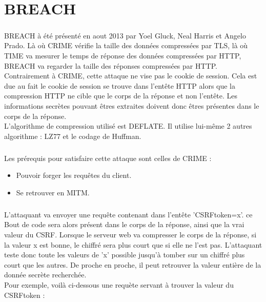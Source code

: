 \chapter{BREACH}
\label{chap:breach}

\paragraph{}
BREACH à été présenté en aout 2013 par Yoel Gluck, Neal Harris et Angelo Prado. Là où CRIME vérifie la taille des données compressées par TLS, là où TIME va mesurer le temps de réponse des données compressées par HTTP, BREACH va regarder la taille des réponses compressées par HTTP. Contrairement à CRIME, cette attaque ne vise pas le cookie de session. Cela est due au fait le cookie de session se trouve dans l'entête HTTP alors que la compression HTTP ne cible que le corps de la réponse et non l'entête. Les informations secrètes pouvant êtres extraites doivent donc êtres présentes dans le corps de la réponse.\\

L'algorithme de compression utilisé est DEFLATE. Il utilise lui-même 2 autres algorithme : LZ77 et le codage de Huffman.

\paragraph{}
Les prérequis pour satisfaire cette attaque sont celles de CRIME :
\begin{itemize}
  \item Pouvoir forger les requêtes du client.
  \item Se retrouver en MITM.
\end{itemize}

\paragraph{}
L'attaquant va envoyer une requête contenant dans l'entête 'CSRFtoken=x'. ce Bout de code sera alors présent dans le corps de la réponse, ainsi que la vrai valeur du CSRF. Lorsque le serveur web va compresser le corps de la réponse, si la valeur x est bonne, le chiffré sera plus court que si elle ne l'est pas. L'attaquant teste donc toute les valeurs de 'x' possible jusqu'à tomber sur un chiffré plus court que les autres. De proche en proche, il peut retrouver la valeur entière de la donnée secrète recherchée.\\

Pour exemple, voilà ci-dessous une requète servant à trouver la valeur du CSRFtoken :

